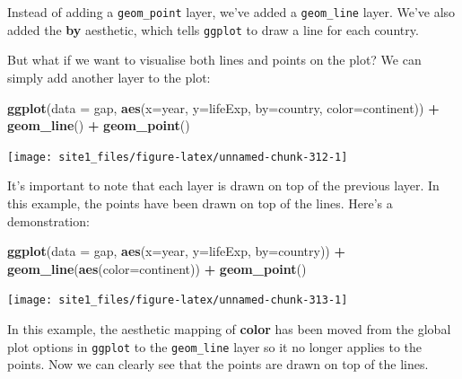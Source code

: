 \documentclass[]{book}
\newenvironment{Shaded}{\begin{snugshade}}{\end{snugshade}}
\newcommand{\KeywordTok}[1]{\textcolor[rgb]{0.13,0.29,0.53}{\textbf{#1}}}
\newcommand{\DataTypeTok}[1]{\textcolor[rgb]{0.13,0.29,0.53}{#1}}
\newcommand{\StringTok}[1]{\textcolor[rgb]{0.31,0.60,0.02}{#1}}
\newcommand{\OperatorTok}[1]{\textcolor[rgb]{0.81,0.36,0.00}{\textbf{#1}}}
\newcommand{\NormalTok}[1]{#1}
\begin{document}
Instead of adding a \texttt{geom\_point} layer, we've added a
\texttt{geom\_line} layer. We've also added the \textbf{by} aesthetic,
which tells \texttt{ggplot} to draw a line for each country.

But what if we want to visualise both lines and points on the plot? We
can simply add another layer to the plot:

\begin{Shaded}
\begin{Highlighting}[]
\KeywordTok{ggplot}\NormalTok{(}\DataTypeTok{data =}\NormalTok{ gap, }\KeywordTok{aes}\NormalTok{(}\DataTypeTok{x=}\NormalTok{year, }\DataTypeTok{y=}\NormalTok{lifeExp, }\DataTypeTok{by=}\NormalTok{country, }\DataTypeTok{color=}\NormalTok{continent)) }\OperatorTok{+}\StringTok{ }
\StringTok{  }\KeywordTok{geom_line}\NormalTok{() }\OperatorTok{+}\StringTok{ }
\StringTok{  }\KeywordTok{geom_point}\NormalTok{()}
\end{Highlighting}
\end{Shaded}

\begin{center}\texttt{[image: site1\_files/figure-latex/unnamed-chunk-312-1]} \end{center}

It's important to note that each layer is drawn on top of the previous
layer. In this example, the points have been drawn on top of the lines.
Here's a demonstration:

\begin{Shaded}
\begin{Highlighting}[]
\KeywordTok{ggplot}\NormalTok{(}\DataTypeTok{data =}\NormalTok{ gap, }\KeywordTok{aes}\NormalTok{(}\DataTypeTok{x=}\NormalTok{year, }\DataTypeTok{y=}\NormalTok{lifeExp, }\DataTypeTok{by=}\NormalTok{country)) }\OperatorTok{+}\StringTok{ }
\StringTok{  }\KeywordTok{geom_line}\NormalTok{(}\KeywordTok{aes}\NormalTok{(}\DataTypeTok{color=}\NormalTok{continent)) }\OperatorTok{+}\StringTok{ }
\StringTok{  }\KeywordTok{geom_point}\NormalTok{()}
\end{Highlighting}
\end{Shaded}

\begin{center}\texttt{[image: site1\_files/figure-latex/unnamed-chunk-313-1]} \end{center}

In this example, the aesthetic mapping of \textbf{color} has been moved
from the global plot options in \texttt{ggplot} to the
\texttt{geom\_line} layer so it no longer applies to the points. Now we
can clearly see that the points are drawn on top of the lines.
\end{document}
